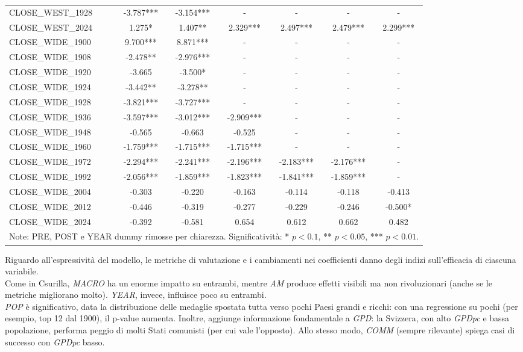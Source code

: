 \begin{table}[H]
{\begin{tabular}{l c c c c c c}
CLOSE\_WEST\_1928 & -3.787*** & -3.154*** & - & - & - & - \\
CLOSE\_WEST\_2024 & 1.275* & 1.407** & 2.329*** & 2.497*** & 2.479*** & 2.299***
\\
CLOSE\_WIDE\_1900 & 9.700*** & 8.871*** & - & - & - & - \\
CLOSE\_WIDE\_1908 & -2.478** & -2.976*** & - & - & - & - \\
CLOSE\_WIDE\_1920 & -3.665 & -3.500* & - & - & - & - \\
CLOSE\_WIDE\_1924 & -3.442** & -3.278** & - & - & - & - \\
CLOSE\_WIDE\_1928 & -3.821*** & -3.727*** & - & - & - & - \\
CLOSE\_WIDE\_1936 & -3.597*** & -3.012*** & -2.909*** & - & - & - \\
CLOSE\_WIDE\_1948 & -0.565 & -0.663 & -0.525 & - & - & - \\
CLOSE\_WIDE\_1960 & -1.759*** & -1.715*** & -1.715*** & - & - & - \\
CLOSE\_WIDE\_1972 & -2.294*** & -2.241*** & -2.196*** & -2.183*** & -2.176*** &
- \\
CLOSE\_WIDE\_1992 & -2.056*** & -1.859*** & -1.823*** & -1.841*** & -1.859*** &
- \\
CLOSE\_WIDE\_2004 & -0.303 & -0.220 & -0.163 & -0.114 & -0.118 & -0.413 \\
CLOSE\_WIDE\_2012 & -0.446 & -0.319 & -0.277 & -0.229 & -0.246 & -0.500* \\
CLOSE\_WIDE\_2024 & -0.392 & -0.581 & 0.654 & 0.612 & 0.662 & 0.482 \\
\bottomrule
\multicolumn{7}{l}{\footnotesize Note: PRE, POST e YEAR dummy rimosse per
chiarezza. Significatività: * $p<0.1$, ** $p<0.05$, *** $p<0.01$.} \\
\end{tabular}%
}
\end{table}

Riguardo all'espressività del modello, le metriche di valutazione e i
cambiamenti nei coefficienti danno degli indizi sull'efficacia di ciascuna
variabile.\\
Come in Csurilla\cite{csurillaLessObviousEffect2023}, \textit{MACRO} ha un
enorme impatto su entrambi, mentre \textit{AM} produce effetti visibili ma non
rivoluzionari (anche se le metriche migliorano molto). \textit{YEAR}, invece,
influisce poco su entrambi.\\
\textit{POP} è significativo, data la distribuzione delle medaglie spostata
tutta verso pochi Paesi grandi e ricchi: con una regressione su pochi (per
esempio, top 12 dal 1900), il p-value aumenta. Inoltre, aggiunge informazione
fondamentale a \textit{GPD}: la Svizzera, con alto \textit{GPDpc} e bassa
popolazione, performa peggio di molti Stati comunisti (per cui vale l'opposto).
Allo stesso modo, \textit{COMM} (sempre rilevante) spiega casi di successo con
\textit{GPDpc} basso.
